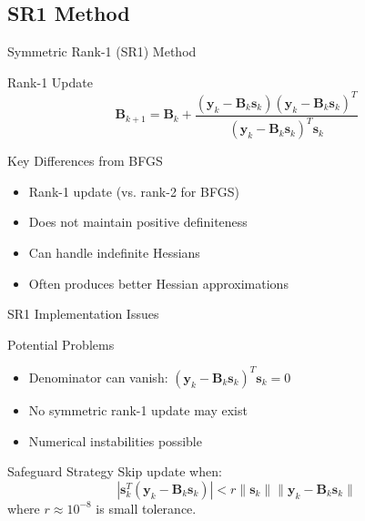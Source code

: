 \documentclass[aspectratio=1610]{beamer}
\begin{document}
\subsection{SR1 Method}

\begin{frame}{Symmetric Rank-1 (SR1) Method}
  \begin{block}{Rank-1 Update}
    $$\mathbf{B}_{k+1} = \mathbf{B}_k + \frac{(\mathbf{y}_k - \mathbf{B}_k \mathbf{s}_k)(\mathbf{y}_k - \mathbf{B}_k \mathbf{s}_k)^T}{(\mathbf{y}_k - \mathbf{B}_k \mathbf{s}_k)^T \mathbf{s}_k}$$
  \end{block}
  
  \vspace{0.5cm}
  \begin{block}{Key Differences from BFGS}
    \begin{itemize}
      \item Rank-1 update (vs. rank-2 for BFGS)
      \item Does not maintain positive definiteness
      \item Can handle indefinite Hessians
      \item Often produces better Hessian approximations
    \end{itemize}
  \end{block}
\end{frame}

\begin{frame}{SR1 Implementation Issues}
  \begin{block}{Potential Problems}
    \begin{itemize}
      \item Denominator can vanish: $(\mathbf{y}_k - \mathbf{B}_k \mathbf{s}_k)^T \mathbf{s}_k = 0$
      \item No symmetric rank-1 update may exist
      \item Numerical instabilities possible
    \end{itemize}
  \end{block}
  
  \vspace{0.5cm}
  \begin{block}{Safeguard Strategy}
    Skip update when:
    $$|\mathbf{s}_k^T(\mathbf{y}_k - \mathbf{B}_k \mathbf{s}_k)| < r\|\mathbf{s}_k\|\|\mathbf{y}_k - \mathbf{B}_k \mathbf{s}_k\|$$
    where $r \approx 10^{-8}$ is small tolerance.
  \end{block}
\end{frame}
\end{document}
